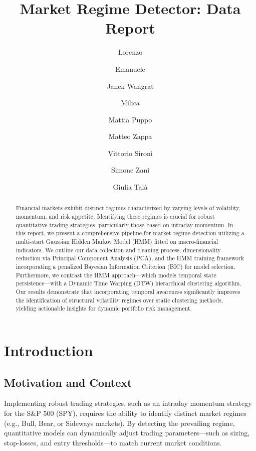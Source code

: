 \documentclass[a4paper,fleqn]{cas-dc} %
\begin{document}

\title[mode = title]{Market Regime Detector: Data Report}


\author[2]{Lorenzo}
\author[2]{Emanuele}
\author[1]{Janek Wangrat}
\author[1]{Milica}
\author[1]{Mattia Puppo}
\author[1]{Matteo Zappa}
\author[1]{Vittorio Sironi}
\author[2]{Simone Zani}
\author[2]{Giulia Talà}


\begin{abstract}
Financial markets exhibit distinct regimes characterized by varying levels of volatility, momentum, and risk appetite. Identifying these regimes is crucial for robust quantitative trading strategies, particularly those based on intraday momentum. In this report, we present a comprehensive pipeline for market regime detection utilizing a multi-start Gaussian Hidden Markov Model (HMM) fitted on macro-financial indicators. We outline our data collection and cleaning process, dimensionality reduction via Principal Component Analysis (PCA), and the HMM training framework incorporating a penalized Bayesian Information Criterion (BIC) for model selection. Furthermore, we contrast the HMM approach—which models temporal state persistence—with a Dynamic Time Warping (DTW) hierarchical clustering algorithm. Our results demonstrate that incorporating temporal awareness significantly improves the identification of structural volatility regimes over static clustering methods, yielding actionable insights for dynamic portfolio risk management.
\end{abstract}

\maketitle

\section{Introduction}

\subsection{Motivation and Context}
Implementing robust trading strategies, such as an intraday momentum strategy for the S\&P 500 (SPY), requires the ability to identify distinct market regimes (e.g., Bull, Bear, or Sideways markets). By detecting the prevailing regime, quantitative models can dynamically adjust trading parameters—such as sizing, stop-losses, and entry thresholds—to match current market conditions.
\end{document}
